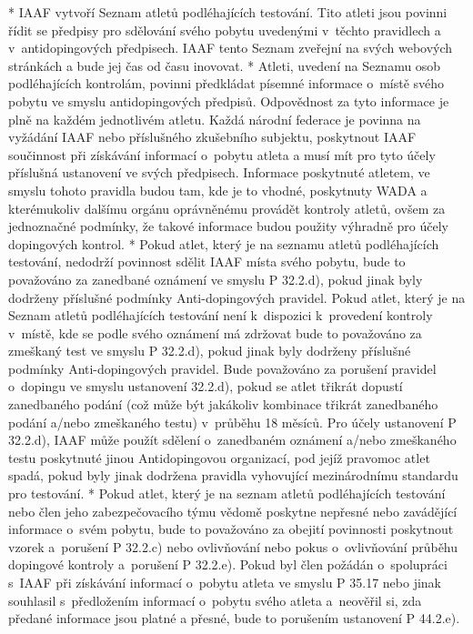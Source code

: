 * IAAF vytvoří Seznam atletů podléhajících testování. Tito atleti jsou povinni řídit se předpisy pro sdělování svého pobytu uvedenými v~těchto pravidlech a v~antidopingových předpisech. IAAF tento Seznam zveřejní na svých webových stránkách a bude jej čas od času inovovat.
* Atleti, uvedení na Seznamu osob podléhajících kontrolám, povinni předkládat písemné informace o~místě svého pobytu ve smyslu antidopingových předpisů. Odpovědnost za tyto informace je plně na každém jednotlivém atletu. Každá národní federace je povinna na vyžádání IAAF nebo příslušného zkušebního subjektu, poskytnout IAAF součinnost při získávání informací o~pobytu atleta a musí mít pro tyto účely příslušná ustanovení ve svých předpisech. Informace poskytnuté atletem, ve smyslu tohoto pravidla budou tam, kde je to vhodné, poskytnuty WADA a kterémukoliv dalšímu orgánu oprávněnému provádět kontroly atletů, ovšem za jednoznačné podmínky, že takové informace budou použity výhradně pro účely dopingových kontrol.
* Pokud atlet, který je na seznamu atletů podléhajících testování, nedodrží povinnost sdělit IAAF místa svého pobytu, bude to považováno za zanedbané oznámení ve smyslu P 32.2.d), pokud jinak byly dodrženy příslušné podmínky Anti-dopingových pravidel. Pokud atlet, který je na Seznam atletů podléhajících testování není k~dispozici k~provedení kontroly v~místě, kde se podle svého oznámení má zdržovat bude to považováno za zmeškaný test ve smyslu P 32.2.d), pokud jinak byly dodrženy příslušné podmínky Anti-dopingových pravidel. Bude považováno za porušení pravidel o~dopingu ve smyslu ustanovení 32.2.d), pokud se atlet třikrát dopustí zanedbaného podání (což může být jakákoliv kombinace třikrát zanedbaného podání a/nebo zmeškaného testu) v~průběhu 18 měsíců. Pro účely ustanovení P 32.2.d), IAAF může použít sdělení o~zanedbaném oznámení a/nebo zmeškaného testu poskytnuté jinou Antidopingovou organizací, pod jejíž pravomoc atlet spadá, pokud byly jinak dodržena pravidla vyhovující mezinárodnímu standardu pro testování.
* Pokud atlet, který je na seznam atletů podléhajících testování nebo člen jeho zabezpečovacího týmu vědomě poskytne nepřesné nebo zavádějící informace o~svém pobytu, bude to považováno za obejití povinnosti poskytnout vzorek a~porušení P 32.2.c) nebo ovlivňování nebo pokus o~ovlivňování průběhu dopingové kontroly a~porušení P 32.2.e). Pokud byl člen požádán o~spolupráci s~IAAF při získávání informací o~pobytu atleta ve smyslu P 35.17 nebo jinak souhlasil s~předložením informací o~pobytu svého atleta a~neověřil si, zda předané informace jsou platné a přesné, bude to porušením ustanovení P 44.2.e).

